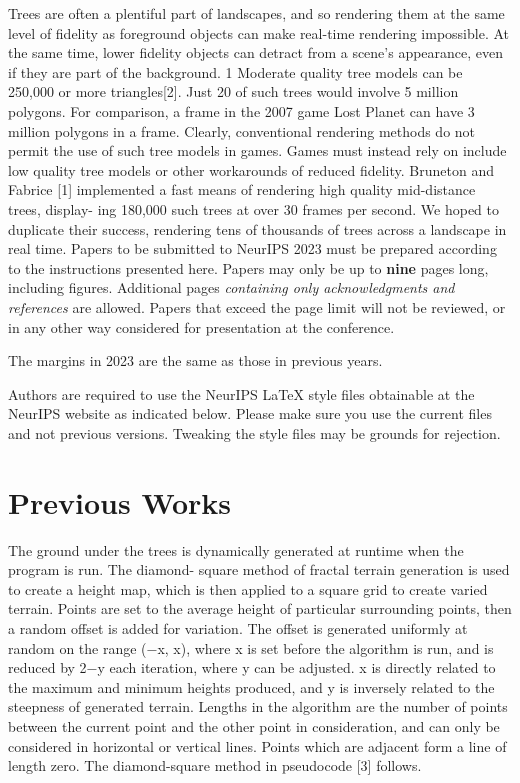 \documentclass{article}
\begin{document}
Trees are often a plentiful part of landscapes, and so rendering them at the same level of fidelity as foreground objects can make real-time rendering impossible. At the same time, lower fidelity objects can detract from a scene’s appearance, even if they are part of the background.
 1
Moderate quality tree models can be 250,000 or more triangles[2]. Just 20 of such trees would involve 5 million polygons. For comparison, a frame in the 2007 game Lost Planet can have 3 million polygons in a frame. Clearly, conventional rendering methods do not permit the use of such tree models in games. Games must instead rely on include low quality tree models or other workarounds of reduced fidelity.
Bruneton and Fabrice [1] implemented a fast means of rendering high quality mid-distance trees, display- ing 180,000 such trees at over 30 frames per second. We hoped to duplicate their success, rendering tens of thousands of trees across a landscape in real time.
Papers to be submitted to NeurIPS 2023 must be prepared according to the
instructions presented here. Papers may only be up to {\bf nine} pages long,
including figures. Additional pages \emph{containing only acknowledgments and
references} are allowed. Papers that exceed the page limit will not be
reviewed, or in any other way considered for presentation at the conference.


The margins in 2023 are the same as those in previous years.


Authors are required to use the NeurIPS \LaTeX{} style files obtainable at the
NeurIPS website as indicated below. Please make sure you use the current files
and not previous versions. Tweaking the style files may be grounds for
rejection.


\section{Previous Works}
The ground under the trees is dynamically generated at runtime when the program is run. The diamond- square method of fractal terrain generation is used to create a height map, which is then applied to a square grid to create varied terrain. Points are set to the average height of particular surrounding points, then a random offset is added for variation. The offset is generated uniformly at random on the range (−x, x), where x is set before the algorithm is run, and is reduced by 2−y each iteration, where y can be adjusted. x is directly related to the maximum and minimum heights produced, and y is inversely related to the steepness of generated terrain. Lengths in the algorithm are the number of points between the current point and the other point in consideration, and can only be considered in horizontal or vertical lines. Points which are adjacent form a line of length zero. The diamond-square method in pseudocode [3] follows. 
\end{document}
